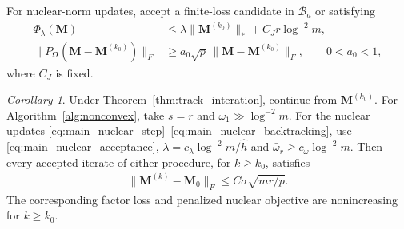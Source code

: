 \documentclass[numsec,webpdf,modern,large,namedate]{oup-authoring-template}
\theoremstyle{plain}
\theoremstyle{remark}
\newtheorem{corollary}{Corollary}[section]
\newcommand{\M}{\bm{M}}
\newcommand{\bOmega}{\bm{\Omega}}
\newif\ifmarkchanges
\newenvironment{revision}{\begingroup\ifmarkchanges\color{red}\fi}{\endgroup}
\begin{document}
\begin{revision}
For nuclear-norm updates, accept a finite-loss candidate in $\mathcal B_a$
or satisfying
\begin{align}
 \Phi_\lambda(\M)&\le\lambda\|\M^{(k_0)}\|_*+C_Jr\log^{-2}m,\nonumber\\
 \|P_{\bOmega}(\M-\M^{(k_0)})\|_F
 &\ge a_0\sqrt p\,\|\M-\M^{(k_0)}\|_F,\qquad 0<a_0<1,
 \label{eq:main_nuclear_acceptance}
\end{align}
where $C_J$ is fixed.
\begin{corollary}
\label{cor:iteration_results}
Under Theorem~\ref{thm:track_interation}, continue from $\M^{(k_0)}$.
For Algorithm~\ref{alg:nonconvex}, take
$s=r$ and $\omega_1\gg\log^{-2}m$.
For the nuclear updates
\eqref{eq:main_nuclear_step}--\eqref{eq:main_nuclear_backtracking}, use
\eqref{eq:main_nuclear_acceptance},
$\lambda=c_\lambda\log^{-2}m/\widehat h$ and
$\bar\omega_r\ge c_\omega\log^{-2}m$.
Then every accepted iterate of either procedure, for $k\ge k_0$, satisfies
\begin{align*}
 \|\M^{(k)}-\M_0\|_F\le C\sigma\sqrt{mr/p}.
\end{align*}
The corresponding factor loss and penalized nuclear objective are
nonincreasing for $k\ge k_0$.
\end{corollary}
\end{revision}
\end{document}
